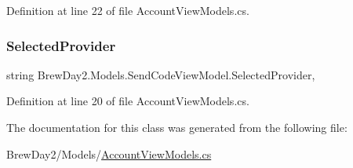 Definition at line 22 of file Account\+View\+Models.\+cs.

\mbox{\label{class_brew_day2_1_1_models_1_1_send_code_view_model_acf7e479efa390c94a2b8525f5ccdaa71}} 
\subsubsection{\texorpdfstring{Selected\+Provider}{SelectedProvider}}
{\footnotesize\ttfamily string Brew\+Day2.\+Models.\+Send\+Code\+View\+Model.\+Selected\+Provider\hspace{0.3cm}{\ttfamily [get]}, {\ttfamily [set]}}



Definition at line 20 of file Account\+View\+Models.\+cs.



The documentation for this class was generated from the following file\+:\begin{DoxyCompactItemize}
\item 
Brew\+Day2/\+Models/\mbox{\hyperlink{_account_view_models_8cs}{Account\+View\+Models.\+cs}}\end{DoxyCompactItemize}
